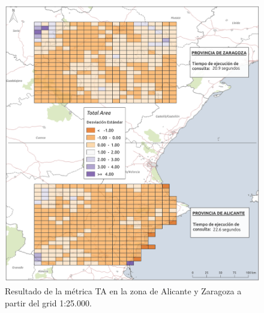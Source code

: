 \begin{figure}
\begin{center}
\includegraphics[width=\textwidth]{ResultadosyDiscusion/Figs/Results/l_25.png}
\caption{Resultado de la métrica TA en la zona de Alicante y Zaragoza a partir del grid 1:25.000.}
\end{center}
\end{figure}

